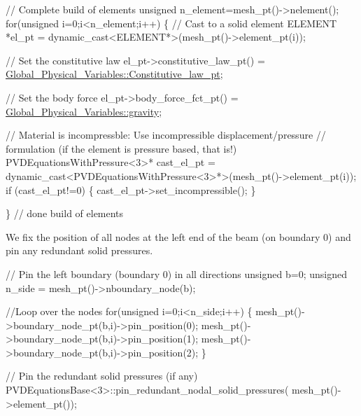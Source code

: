 \begin{DoxyCodeInclude}
 \textcolor{comment}{// Complete build of elements}
 \textcolor{keywordtype}{unsigned} n\_element=mesh\_pt()->nelement();
 \textcolor{keywordflow}{for}(\textcolor{keywordtype}{unsigned} i=0;i<n\_element;i++)
  \{
   \textcolor{comment}{// Cast to a solid element}
   ELEMENT *el\_pt = \textcolor{keyword}{dynamic\_cast<}ELEMENT*\textcolor{keyword}{>}(mesh\_pt()->element\_pt(i));
   
   \textcolor{comment}{// Set the constitutive law}
   el\_pt->constitutive\_law\_pt() =
    \hyperlink{namespaceGlobal__Physical__Variables_a2a37fb040c832ee7a086bb13bb02a100}{Global\_Physical\_Variables::Constitutive\_law\_pt};

   \textcolor{comment}{// Set the body force}
   el\_pt->body\_force\_fct\_pt() = \hyperlink{namespaceGlobal__Physical__Variables_a0777aef63372db7f91ad894c38159681}{Global\_Physical\_Variables::gravity};

   \textcolor{comment}{// Material is incompressble: Use incompressible displacement/pressure}
   \textcolor{comment}{// formulation (if the element is pressure based, that is!)}
   PVDEquationsWithPressure<3>* cast\_el\_pt = 
    \textcolor{keyword}{dynamic\_cast<}PVDEquationsWithPressure<3>*\textcolor{keyword}{>}(mesh\_pt()->element\_pt(i));
   \textcolor{keywordflow}{if} (cast\_el\_pt!=0)
    \{
     cast\_el\_pt->set\_incompressible();
    \}

  \} \textcolor{comment}{// done build of elements}

\end{DoxyCodeInclude}


We fix the position of all nodes at the left end of the beam (on boundary 0) and pin any redundant solid pressures.


\begin{DoxyCodeInclude}

 
 \textcolor{comment}{// Pin the left boundary (boundary 0) in all directions}
 \textcolor{keywordtype}{unsigned} b=0; 
 \textcolor{keywordtype}{unsigned} n\_side = mesh\_pt()->nboundary\_node(b);
 
 \textcolor{comment}{//Loop over the nodes}
 \textcolor{keywordflow}{for}(\textcolor{keywordtype}{unsigned} i=0;i<n\_side;i++)
  \{
   mesh\_pt()->boundary\_node\_pt(b,i)->pin\_position(0);
   mesh\_pt()->boundary\_node\_pt(b,i)->pin\_position(1);
   mesh\_pt()->boundary\_node\_pt(b,i)->pin\_position(2);
  \}

 \textcolor{comment}{// Pin the redundant solid pressures (if any)}
 PVDEquationsBase<3>::pin\_redundant\_nodal\_solid\_pressures(
  mesh\_pt()->element\_pt());

\end{DoxyCodeInclude}


